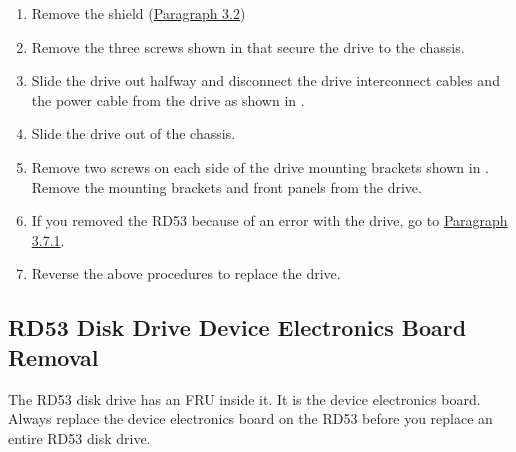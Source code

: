 \begin{enumerate}

\item	Remove the shield (\hyperlink{section.3.2}{Paragraph 3.2})

\item	Remove the three screws shown in  that secure the drive to
		the chassis.


\newpage

\item	Slide the drive out halfway and disconnect the drive interconnect cables
		and the power cable from the drive as shown in .


\item	Slide the drive out of the chassis.

\newpage

\item	Remove two screws on each side of the drive mounting brackets shown
		in . Remove the mounting brackets and front panels from
		the drive.


\item	If you removed the RD53 because of an error with the drive, go to
		\hyperlink{section.3.7.1}{Paragraph 3.7.1}.

\item	Reverse the above procedures to replace the drive.
\end{enumerate}

\subsection{RD53 Disk Drive Device Electronics Board Removal}

The RD53 disk drive has an FRU inside it. It is the device electronics board.
Always replace the device electronics board on the RD53 before you replace
an entire RD53 disk drive.


